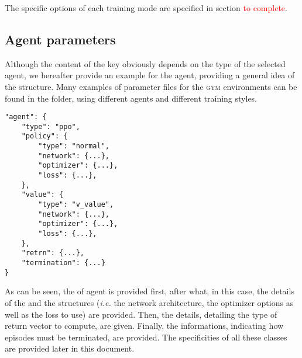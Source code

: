 The specific options of each training mode are specified in section \textcolor{red}{to complete}.

\subsection{Agent parameters}
\label{section:agent_parameters}

Although the content of the  key obviously depends on the type of the selected agent, we hereafter provide an example for the \ppo agent, providing a general idea of the structure. Many examples of parameter files for the \textsc{gym} environments can be found in the  folder, using different agents and different training styles.

\begin{verbatim}
"agent": {
	"type": "ppo",
	"policy": {
		"type": "normal",
		"network": {...},
		"optimizer": {...},
		"loss": {...},
	},
	"value": {
		"type": "v_value",
		"network": {...},
		"optimizer": {...},
		"loss": {...},
	},
	"retrn": {...},
	"termination": {...}
}
\end{verbatim}

As can be seen, the  of agent is provided first, after what, in this case, the details of the  and the  structures (\textit{i.e.} the network architecture, the optimizer options as well as the loss to use) are provided. Then, the  details, detailing the type of return vector to compute, are given. Finally, the  informations, indicating how episodes must be terminated, are provided. The specificities of all these classes are provided later in this document.
